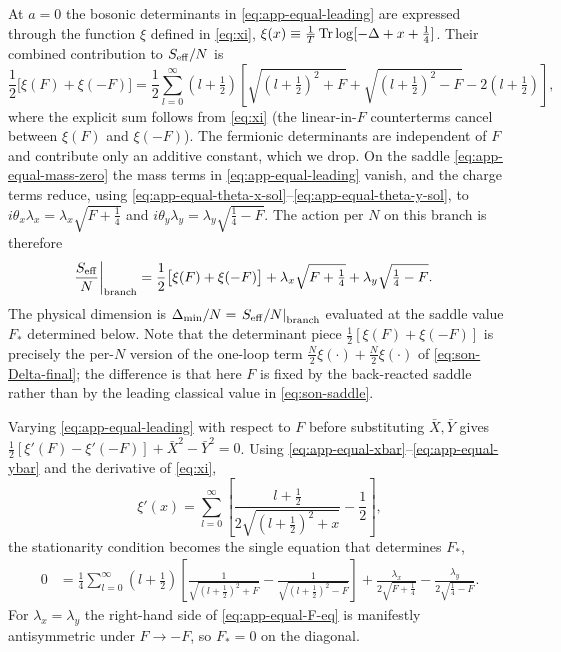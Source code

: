 \documentclass[a4paper,11pt]{article}
\newcommand\Dm{\Delta_{\min}}
\begin{document}
\begin{appendix}
At $a=0$ the bosonic determinants in \eqref{eq:app-equal-leading} are expressed through the function $\xi$ defined in \eqref{eq:xi}, $\xi(x)\equiv\frac1T\Tr\log[-\Delta+x+\frac14]$. Their combined contribution to $S_{\rm eff}/N$ is
\begin{equation}
  \frac12\bigl[\xi(F)+\xi(-F)\bigr]
  =\frac12\sum_{l=0}^{\infty}\left(l+\tfrac12\right)
  \left[\sqrt{\left(l+\tfrac12\right)^2+F}+\sqrt{\left(l+\tfrac12\right)^2-F}-2\left(l+\tfrac12\right)\right],
\label{eq:app-equal-det-sum}
\end{equation}
where the explicit sum follows from \eqref{eq:xi} (the linear-in-$F$ counterterms cancel between $\xi(F)$ and $\xi(-F)$). The fermionic determinants are independent of $F$ and contribute only an additive constant, which we drop. On the saddle \eqref{eq:app-equal-mass-zero} the mass terms in \eqref{eq:app-equal-leading} vanish, and the charge terms reduce, using \eqref{eq:app-equal-theta-x-sol}--\eqref{eq:app-equal-theta-y-sol}, to $i\theta_x \lambda_x=\lambda_x\sqrt{F+\frac14}$ and $i\theta_y \lambda_y=\lambda_y\sqrt{\frac14-F}$. The action per $N$ on this branch is therefore
\begin{align}
\left.\frac{S_{\rm eff}}{N}\right|_{\rm branch}
&=
\frac12\bigl[\xi(F)+\xi(-F)\bigr]
+\lambda_x\sqrt{F+\tfrac14}+\lambda_y\sqrt{\tfrac14-F}.
\label{eq:app-equal-reduced}
\end{align}
The physical dimension is $\Dm/N = \left.S_{\rm eff}/N\right|_{\rm branch}$ evaluated at the saddle value $F_*$ determined below. Note that the determinant piece $\frac12[\xi(F)+\xi(-F)]$ is precisely the per-$N$ version of the one-loop term $\frac{N}{2}\xi(\cdot)+\frac{N}{2}\xi(\cdot)$ of \eqref{eq:son-Delta-final}; the difference is that here $F$ is fixed by the back-reacted saddle rather than by the leading classical value in \eqref{eq:son-saddle}.

Varying \eqref{eq:app-equal-leading} with respect to $F$ before substituting $\bar{X},\bar{Y}$ gives $\frac12[\xi'(F)-\xi'(-F)]+\bar X^2-\bar Y^2=0$. Using \eqref{eq:app-equal-xbar}--\eqref{eq:app-equal-ybar} and the derivative of \eqref{eq:xi},
\begin{equation}
  \xi'(x)=\sum_{l=0}^{\infty}\left[\frac{l+\frac12}{2\sqrt{\left(l+\frac12\right)^2+x}}-\frac12\right], \label{eq:app-equal-xi-prime}
\end{equation}
the stationarity condition becomes the single equation that determines $F_*$,
\begin{align}
0
&=
\frac14\sum_{l=0}^{\infty}
\left(l+\tfrac12\right)\left[\frac{1}{\sqrt{\left(l+\frac12\right)^2+F}}-\frac{1}{\sqrt{\left(l+\frac12\right)^2-F}}\right]
+\frac{\lambda_x}{2\sqrt{F+\frac14}}-\frac{\lambda_y}{2\sqrt{\frac14-F}}.
\label{eq:app-equal-F-eq}
\end{align}
For $\lambda_x=\lambda_y$ the right-hand side of \eqref{eq:app-equal-F-eq} is manifestly antisymmetric under $F\to -F$, so $F_*=0$ on the diagonal.


\end{appendix}
\end{document}
